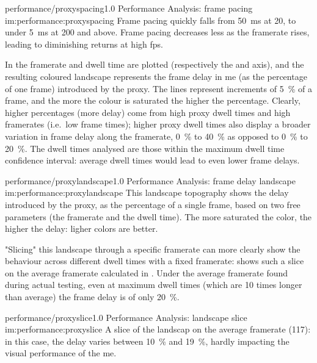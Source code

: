 \begin{image}
	{performance/proxyspacing}{1.0}
	{Performance Analysis: frame pacing}
	{im:performance:proxyspacing}
	{}
	{Frame pacing quickly falls from \SI{50}{\milli\second} at \SI{20}{\fps}, to under \SI{5}{\milli\second} at \SI{200}{\fps} and above. Frame pacing decreases less as the \gls{framerate} rises, leading to diminishing returns at high \gls{fps}.}
\end{image}

In  the \gls{framerate} and dwell time are plotted (respectively the  and  axis), and the resulting coloured landscape represents the frame delay in \gls{me} (as the percentage of one frame) introduced by the \gls{proxy}. The lines represent increments of \SI{5}{\percent} of a frame, and the more the colour is saturated the higher the percentage. Clearly, higher percentages (more delay) come from high \gls{proxy} dwell times and high \glspl{framerate} (i.e.\ low frame times); higher \gls{proxy} dwell times also display a broader variation in frame delay along the \gls{framerate}, \SI{0}{\percent} to \SI{40}{\percent} as opposed to \SI{0}{\percent} to \SI{20}{\percent}. The dwell times analysed are those within the maximum dwell time confidence interval: average dwell times would lead to even lower frame delays.

\begin{image}
	{performance/proxylandscape}{1.0}
	{Performance Analysis: frame delay landscape}
	{im:performance:proxylandscape}
	{}
	{This landscape topography shows the delay introduced by the \gls{proxy}, as the percentage of a single frame, based on two free parameters (the \gls{framerate} and the dwell time). The more saturated the color, the higher the delay: ligher colors are better.}
\end{image}

"Slicing" this landscape through a specific \gls{framerate} can more clearly show the behaviour across different dwell times with a fixed \gls{framerate}:  shows such a slice on the average \gls{framerate} calculated in . Under the average \gls{framerate} found during actual testing, even at maximum dwell times (which are \num{10} times longer than average) the frame delay is of only \SI{20}{\percent}.

\begin{image}
	{performance/proxyslice}{1.0}
	{Performance Analysis: landscape slice}
	{im:performance:proxyslice}
	{}
	{A slice of the landscap on the average \gls{framerate} (\SI{117}{\fps}): in this case, the delay varies between \SI{10}{\percent} and \SI{19}{\percent}, hardly impacting the visual performance of the \gls{me}.}
\end{image} %

